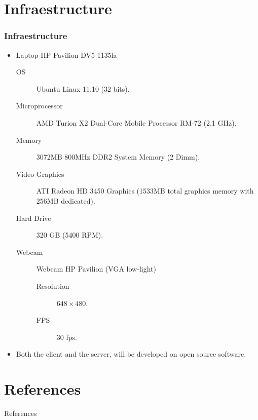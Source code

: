 \documentclass[compress]{beamer}
\begin{document}
\section{Infraestructure}
\begin{frame}
	\frametitle{Infraestructure}
	\begin{itemize}
	\item Laptop HP Pavilion DV5-1135la
		\begin{description}
		\item[OS] Ubuntu Linux 11.10 (32 bits).
		\item[Microprocessor] AMD Turion X2 Dual-Core Mobile Processor RM-72 (2.1 GHz).
		\item[Memory] 3072MB 800MHz DDR2 System Memory (2 Dimm).
		\item[Video Graphics] ATI Radeon HD 3450 Graphics (1533MB total graphics memory with 256MB dedicated).
		\item[Hard Drive] 320 GB (5400 RPM).
		\item[Webcam] Webcam HP Pavilion (VGA low-light)
			\begin{description}
			\item[Resolution] $648 \times 480$.
			\item[FPS] 30 fps.
			\end{description}
		\end{description}
	\item Both the client and the server, will be developed on open source software.
	\end{itemize}
\end{frame}


\section{References}
\begin{frame}[allowframebreaks]{References}
\beamertemplatebookbibitems

%

\end{frame}
\end{document}
